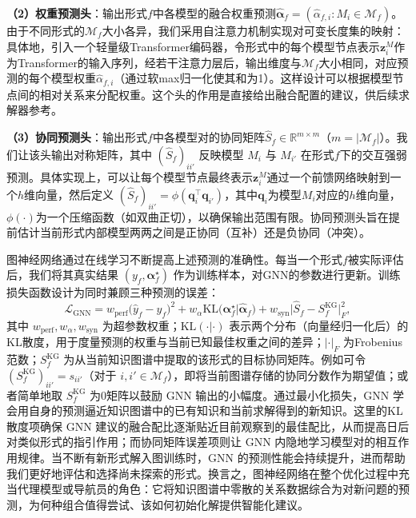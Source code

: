 \documentclass[../main.tex]{subfiles}
\begin{document}
\textbf{（2）权重预测头}：输出形式$f$中各模型的融合权重预测$\hat{\boldsymbol{\alpha}}_f = (\hat{\alpha}_{f,i}: M_i \in \mathcal{M}_f)$。由于不同形式的$\mathcal{M}_f$大小各异，我们采用自注意力机制实现对可变长度集的映射：具体地，引入一个轻量级Transformer编码器，令形式中的每个模型节点表示$\mathbf{z}^M_i$作为Transformer的输入序列，经若干注意力层后，输出维度与$\mathcal{M}_f$大小相同，对应预测的每个模型权重$\hat{\alpha}_{f,i}$（通过软max归一化使其和为1）。这样设计可以根据模型节点间的相对关系来分配权重。这个头的作用是直接给出融合配置的建议，供后续求解器参考。

\textbf{（3）协同预测头}：输出形式$f$中各模型对的协同矩阵$\hat{S}_f \in \mathbb{R}^{m\times m}$（$m=|\mathcal{M}_f|$）。我们让该头输出对称矩阵，其中 $(\hat{S}_f)_{ii'}$ 反映模型 $M_i$ 与 $M_{i'}$ 在形式$f$下的交互强弱预测。具体实现上，可以让每个模型节点最终表示$\mathbf{z}^M_i$通过一个前馈网络映射到一个$h$维向量，然后定义 $(\hat{S}_f)_{ii'} = \phi(\mathbf{q}_i^\top \mathbf{q}_{i'})$，其中$\mathbf{q}_i$为模型$M_i$对应的$h$维向量，$\phi(\cdot)$为一个压缩函数（如双曲正切），以确保输出范围有限。协同预测头旨在提前估计当前形式内部模型两两之间是正协同（互补）还是负协同（冲突）。

图神经网络通过在线学习不断提高上述预测的准确性。每当一个形式$f$被实际评估后，我们将其真实结果 $(y_f, \boldsymbol{\alpha}_f^\star)$ 作为训练样本，对GNN的参数进行更新。训练损失函数设计为同时兼顾三种预测的误差：
\begin{equation}
	\mathcal{L}_{\text{GNN}} =
	w_{\text{perf}}\big(\hat{y}_f - y_f\big)^2
	+
	w_{\alpha}\text{KL}\big(\boldsymbol{\alpha}_f^\star | \hat{\boldsymbol{\alpha}}_f\big)
	+
	w_{\text{syn}}\big|\hat{S}_f - S^{\text{KG}}_f\big|_F^2,
\end{equation}
其中 $w_{\text{perf}}, w_{\alpha}, w_{\text{syn}}$ 为超参数权重；$\text{KL}(\cdot|\cdot)$ 表示两个分布（向量经归一化后）的KL散度，用于度量预测的权重与当前已知最佳权重之间的差异；$|\cdot|_F$ 为Frobenius范数；$S^{\text{KG}}_f$ 为从当前知识图谱中提取的该形式的目标协同矩阵。例如可令 $(S^{\text{KG}}_f)_{ii'} = s_{ii'}$（对于 $i,i'\in \mathcal{M}_f$），即将当前图谱存储的协同分数作为期望值；或者简单地取 $S^{\text{KG}}_f$ 为0矩阵以鼓励 GNN 输出的小幅度。通过最小化损失，GNN 学会用自身的预测逼近知识图谱中的已有知识和当前求解得到的新知识。这里的KL散度项确保 GNN 建议的融合配比逐渐贴近目前观察到的最佳配比，从而提高日后对类似形式的指引作用；而协同矩阵误差项则让 GNN 内隐地学习模型对的相互作用规律。当不断有新形式解入图训练时，GNN 的预测性能会持续提升，进而帮助我们更好地评估和选择尚未探索的形式。换言之，图神经网络在整个优化过程中充当代理模型或导航员的角色：它将知识图谱中零散的关系数据综合为对新问题的预测，为何种组合值得尝试、该如何初始化解提供智能化建议。
\end{document}
